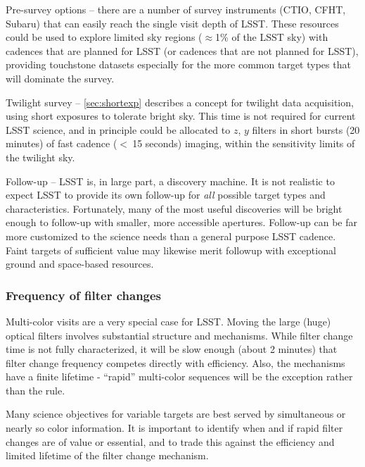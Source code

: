 \begin{description}

\item{Pre-survey options} -- there are a number of survey instruments
(CTIO, CFHT, Subaru) that can easily reach the single visit depth of
LSST. These resources could be used to explore limited sky regions
($\approx$1\% of the LSST sky) with cadences that are planned for LSST
(or cadences that are not planned for LSST), providing touchstone
datasets especially for the more common target types that will dominate
the survey.

\item{Twilight survey} -- \autoref{sec:shortexp} describes a concept for
twilight data acquisition, using short exposures to tolerate bright sky.
This time is not required for current LSST science, and in principle
could be allocated to $z$, $y$ filters in short bursts (20 minutes) of
fast cadence ($<~$15 seconds) imaging, within the sensitivity limits of
the twilight sky.

\item{Follow-up} -- LSST is, in large part, a discovery machine. It is
not realistic to expect LSST to provide its own follow-up for {\it all}
possible target types and characteristics. Fortunately, many of the most
useful discoveries will be bright enough to follow-up with smaller, more
accessible apertures.  Follow-up can be far more customized to the
science needs than a general purpose LSST cadence.  Faint targets of
sufficient value may likewise merit followup with exceptional  ground
and space-based resources.

\end{description}


\subsubsection{Frequency of filter changes}

Multi-color visits are a very special case for LSST.  Moving the large
(huge) optical filters involves substantial structure and mechanisms.
While filter change time is not fully characterized, it will be slow
enough (about 2 minutes) that filter change frequency competes directly
with efficiency. Also, the mechanisms have a finite lifetime - ``rapid''
multi-color sequences will be the exception rather than the rule.  

Many science objectives for variable targets are best served by 
simultaneous or nearly so color information.   It is important to identify 
when and if rapid filter changes are of value or essential, and to trade this
against the efficiency and limited lifetime of the filter change mechanism.


